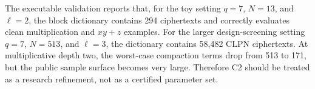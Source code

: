 The executable validation reports that, for the toy setting $q=7$, $N=13$, and $\ell=2$, the block dictionary contains 294 ciphertexts and correctly evaluates clean multiplication and $xy+z$ examples.  For the larger design-screening setting $q=7$, $N=513$, and $\ell=3$, the dictionary contains 58,482 CLPN ciphertexts.  At multiplicative depth two, the worst-case compaction terms drop from 513 to 171, but the public sample surface becomes very large.  Therefore C2 should be treated as a research refinement, not as a certified parameter set.
